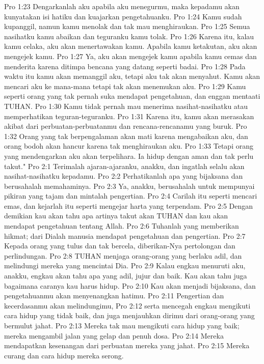 Pro 1:23  Dengarkanlah aku apabila aku menegurmu, maka kepadamu akan kunyatakan isi hatiku dan kuajarkan pengetahuanku.
Pro 1:24  Kamu sudah kupanggil, namun kamu menolak dan tak mau menghiraukan.
Pro 1:25  Semua nasihatku kamu abaikan dan teguranku kamu tolak.
Pro 1:26  Karena itu, kalau kamu celaka, aku akan menertawakan kamu. Apabila kamu ketakutan, aku akan mengejek kamu.
Pro 1:27  Ya, aku akan mengejek kamu apabila kamu cemas dan menderita karena ditimpa bencana yang datang seperti badai.
Pro 1:28  Pada waktu itu kamu akan memanggil aku, tetapi aku tak akan menyahut. Kamu akan mencari aku ke mana-mana tetapi tak akan menemukan aku.
Pro 1:29  Kamu seperti orang yang tak pernah suka mendapat pengetahuan, dan enggan mentaati TUHAN.
Pro 1:30  Kamu tidak pernah mau menerima nasihat-nasihatku atau memperhatikan teguran-teguranku.
Pro 1:31  Karena itu, kamu akan merasakan akibat dari perbuatan-perbuatanmu dan rencana-rencanamu yang buruk.
Pro 1:32  Orang yang tak berpengalaman akan mati karena mengabaikan aku, dan orang bodoh akan hancur karena tak menghiraukan aku.
Pro 1:33  Tetapi orang yang mendengarkan aku akan terpelihara. Ia hidup dengan aman dan tak perlu takut."
Pro 2:1  Terimalah ajaran-ajaranku, anakku, dan ingatlah selalu akan nasihat-nasihatku kepadamu.
Pro 2:2  Perhatikanlah apa yang bijaksana dan berusahalah memahaminya.
Pro 2:3  Ya, anakku, berusahalah untuk mempunyai pikiran yang tajam dan mintalah pengertian.
Pro 2:4  Carilah itu seperti mencari emas, dan kejarlah itu seperti mengejar harta yang terpendam.
Pro 2:5  Dengan demikian kau akan tahu apa artinya takut akan TUHAN dan kau akan mendapat pengetahuan tentang Allah.
Pro 2:6  Tuhanlah yang memberikan hikmat; dari Dialah manusia mendapat pengetahuan dan pengertian.
Pro 2:7  Kepada orang yang tulus dan tak bercela, diberikan-Nya pertolongan dan perlindungan.
Pro 2:8  TUHAN menjaga orang-orang yang berlaku adil, dan melindungi mereka yang mencintai Dia.
Pro 2:9  Kalau engkau menuruti aku, anakku, engkau akan tahu apa yang adil, jujur dan baik. Kau akan tahu juga bagaimana caranya kau harus hidup.
Pro 2:10  Kau akan menjadi bijaksana, dan pengetahuanmu akan menyenangkan hatimu.
Pro 2:11  Pengertian dan kecerdasanmu akan melindungimu,
Pro 2:12  serta mencegah engkau mengikuti cara hidup yang tidak baik, dan juga menjauhkan dirimu dari orang-orang yang bermulut jahat.
Pro 2:13  Mereka tak mau mengikuti cara hidup yang baik; mereka mengambil jalan yang gelap dan penuh dosa.
Pro 2:14  Mereka mendapatkan kesenangan dari perbuatan mereka yang jahat.
Pro 2:15  Mereka curang dan cara hidup mereka serong.
